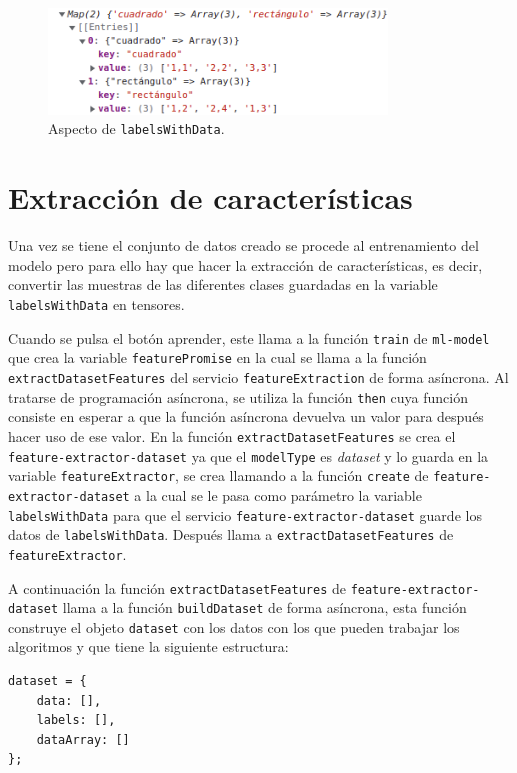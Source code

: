 \documentclass[a4paper, 12pt]{book}
\begin{document}
\begin{figure}
	\centering
	\includegraphics[width=9cm, keepaspectratio]{img/ejemplo1.png}
	\caption{Aspecto de \texttt{labelsWithData}.} 	\label{fig:ejemplo1}
\end{figure}


\section{Extracción de características}
\label{subsec:caracteristicas}

Una vez se tiene el conjunto de datos creado se procede al entrenamiento del modelo pero para ello hay que hacer la extracción de características, es decir, convertir las muestras de las diferentes clases guardadas en la variable \texttt{labelsWithData} en tensores.

Cuando se pulsa el botón aprender, este llama a la función \texttt{train} de \texttt{ml-model} que crea la variable \texttt{featurePromise} en la cual se llama a la función \texttt{extractDatasetFeatures} del servicio \texttt{featureExtraction} de forma asíncrona. 
Al tratarse de programación asíncrona, se utiliza la función \texttt{then} cuya función consiste en esperar a que la función asíncrona devuelva un valor para después hacer uso de ese valor. 
En la función \texttt{extractDatasetFeatures} se crea el \texttt{feature-extractor-dataset} ya que el \texttt{modelType} es \emph{dataset} y lo guarda en la variable \texttt{featureExtractor}, se crea llamando a la función \texttt{create} de \texttt{feature-extractor-dataset} a la cual se le pasa como parámetro la variable \texttt{labelsWithData} para que el servicio \texttt{feature-extractor-dataset} guarde los datos de \texttt{labelsWithData}. 
Después llama a \texttt{extractDatasetFeatures} de \texttt{featureExtractor}.

A continuación la función \texttt{extractDatasetFeatures} de \texttt{feature-extractor-dataset} llama a la función \texttt{buildDataset} de forma asíncrona, esta función construye el objeto \texttt{dataset} con los datos con los que pueden trabajar los algoritmos y que tiene la siguiente estructura:
\begin{verbatim}
dataset = {
    data: [],
    labels: [],
    dataArray: []
};
\end{verbatim}
\end{document}
